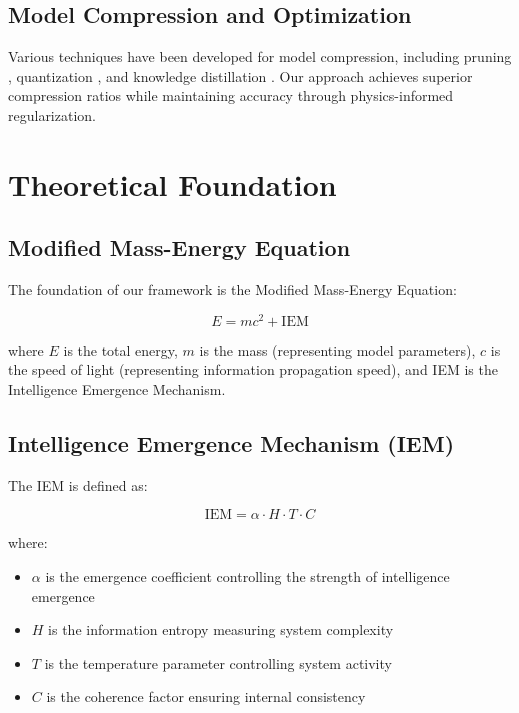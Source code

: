 \documentclass[12pt]{article}
\begin{document}
\subsection{Model Compression and Optimization}

Various techniques have been developed for model compression, including pruning \cite{lecun1989optimal}, quantization \cite{hubara2016quantized}, and knowledge distillation \cite{hinton2015distilling}. Our approach achieves superior compression ratios while maintaining accuracy through physics-informed regularization.

\section{Theoretical Foundation}

\subsection{Modified Mass-Energy Equation}

The foundation of our framework is the Modified Mass-Energy Equation:

\begin{equation}
E = mc^2 + \text{IEM}
\end{equation}

where $E$ is the total energy, $m$ is the mass (representing model parameters), $c$ is the speed of light (representing information propagation speed), and IEM is the Intelligence Emergence Mechanism.

\subsection{Intelligence Emergence Mechanism (IEM)}

The IEM is defined as:

\begin{equation}
\text{IEM} = \alpha \cdot H \cdot T \cdot C
\end{equation}

where:
\begin{itemize}
\item $\alpha$ is the emergence coefficient controlling the strength of intelligence emergence
\item $H$ is the information entropy measuring system complexity
\item $T$ is the temperature parameter controlling system activity
\item $C$ is the coherence factor ensuring internal consistency
\end{itemize}
\end{document}
